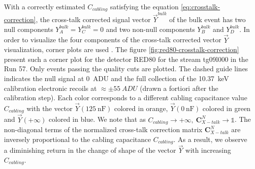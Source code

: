 With a correctly estimated $C_{cabling}$ satisfying the equation \ref{eq:crosstalk-correction}, the cross-talk corrected signal vector $\vec{Y}^{bulk}$ of the bulk event has two null components $Y_A^{bulk} = Y_C^{bulk} = 0$ and two non-null components $Y_B^{bulk}$ and $Y_D^{bulk}$.
In order to visualize the four components of the cross-talk corrected vector $\vec{Y}$ visualization, corner plots are used . The figure \ref{fig:red80-crosstalk-correction} present such a corner plot for the detector RED80 for the stream tg09l000 in the Run 57. Only events passing the quality cuts are plotted. The dashed guide lines indicates the null signal at \SI{0}{ADU} and the full collection of the \SI{10.37}{\kilo\eV} calibration electronic recoils  at $\approx \pm \SI{55}{ADU}$ (drawn a fortiori after the calibration step).
Each color corresponds to a different cabling capacitance value $C_{cabling}$ with the vector $\vec{Y}(\SI{125}{\nano\farad})$ colored in orange, $\vec{Y}(\SI{0}{\nano\farad})$ colored in green and $\vec{Y}(+\infty)$ colored in blue. We note that as $C_{cabling} \rightarrow +\infty, \ \bm{C}_{X-talk}^N \rightarrow \mathbb{1}$. The non-diagonal terms of the normalized cross-talk correction matrix $\bm{C}_{X-talk}^N$ are inversely proportional to the cabling capacitance $C_{cabling}$. As a result, we observe a diminishing return in the change of shape of the vector $\vec{Y}$ with increasing $C_{cabling}$.


